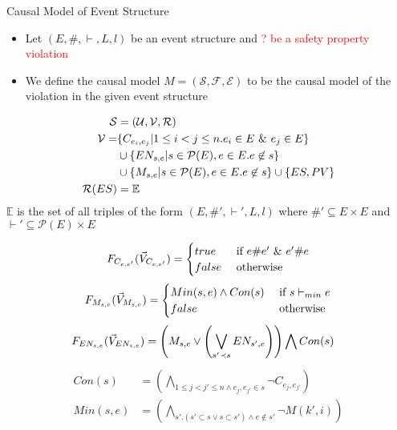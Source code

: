 \begin{frame}{Causal Model of Event Structure}
    \begin{itemize}
        \item Let $(E,\#,\vdash,L,l)$ be an event structure
              and \textcolor{red}{? be a safety property violation}
        \item
              We define the causal model $M = (\mathcal{S},\mathcal{F},\mathcal{E})$
              to be the causal model of the violation in the given event structure
    \end{itemize}
    \begin{align*}
        \mathcal{S}     & = (\mathcal{U},\mathcal{V},\mathcal{R})  \\
        \mathcal{V} =   & \{C_{e_i,e_j} |  1 \leq i < j \leq n.
        e_i \in E \ \& \  e_j \in E\}                                  \\
                        & \cup \{EN_{s,e} | s \in \mathcal{P}(E),
        e \in E. e \not \in s \}                                    \\
                        & \cup \{M_{s,e} | s \in \mathcal{P}(E),
        e \in E. e \not \in s \} \cup \{ES,PV\}                     \\
        \mathcal{R}(ES) & = \mathbb{E}
    \end{align*}
    $\mathbb{E}$ is the set of all
    triples of the form $(E,\#',\vdash',L,l)$ where $\#' \subseteq E \times E$
    and $\vdash' \subseteq \mathcal{P}(E) \times E$
\end{frame}

\begin{frame}
    $$
        F_{C_{e,e'}}(\vec V_{C_{e,e'}}) = \begin{cases}
            true  & \text{ if } e \# e' \ \& \  e' \# e \\
            false & \text{ otherwise }
        \end{cases}
    $$
    $$
        F_{M_{s,e}}(\vec V_{M_{s,e}}) = \begin{cases}
            Min(s,e) \wedge Con(s) & \text{ if } s \vdash_{min} e \\
            false                  & \text{ otherwise }
        \end{cases}
    $$
    \begin{align*}
        F_{EN_{s,e}}(\vec V_{EN_{s,e}}) & = \left( M_{s,e} \vee
        \left( \bigvee_{s'\prec s}EN_{s',e} \right)
        \right) \bigwedge Con(s)
    \end{align*}
    \begin{align*}
        Con(s)   & =   \left(
        \bigwedge_{ 1\leq j<j' \leq n \wedge e_j,e_{j'} \in s}
        \neg C_{e_j,e_{j'}}
        \right)               \\
        Min(s,e) & = \left(
        \bigwedge_{s'. (s' \subset s \vee s \subset s')
            \wedge e \notin s'}
        \neg M(k',i)
        \right)
    \end{align*}
\end{frame}

